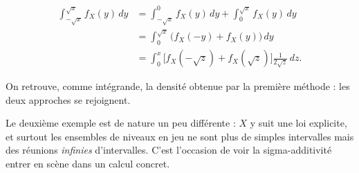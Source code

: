 \begin{exemple}
\begin{itemize}
\begin{align*}
\int_{-\sqrt{x}}^{\sqrt{x}} f_X(y)\, dy &= \int_{-\sqrt{x}}^0 f_X(y)\, dy + \int_0^{\sqrt{x}} f_X(y)\, dy \\
&= \int_0^{\sqrt{x}} \big(f_X(-y) + f_X(y)\big)\, dy \\
&= \int_0^x \big[f_X(-\sqrt{z}) + f_X(\sqrt{z})\big] \frac{1}{2\sqrt{z}}\, dz.
\end{align*}

On retrouve, comme intégrande, la densité obtenue par la première méthode : les deux approches se rejoignent.
\end{itemize}
\end{exemple}

Le deuxième exemple est de nature un peu différente : $X$ y suit une loi explicite, et surtout les ensembles de niveaux en jeu ne sont plus de simples intervalles mais des réunions \emph{infinies} d'intervalles. C'est l'occasion de voir la sigma-additivité entrer en scène dans un calcul concret.

